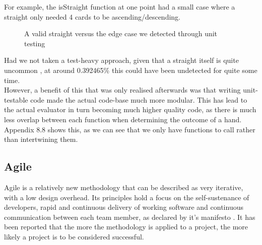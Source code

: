 \documentclass[11pt]{article}
\begin{document}
For example, the isStraight function at one point had a small case where a straight only needed 4 cards to be ascending/descending. \\

\begin{figure}[h]
	\caption{A valid straight versus the edge case we detected through unit testing}
\end{figure}

Had we not taken a test-heavy approach, given that a straight itself is quite uncommon \cite{str_uncommon}, at around 0.392465\% this could have been undetected for quite some time. \\

However, a benefit of this that was only realised afterwards was that writing unit-testable code made the actual code-base much more modular. This has lead to the actual evaluator in turn becoming much higher quality code, as there is much less overlap between each function when determining the outcome of a hand.  Appendix 8.8 shows this, as we can see that we only have functions to call rather than intertwining them. 


\newpage
\subsection{Agile}

Agile is a relatively new methodology that can be described as very iterative, with a low design overhead. Its principles hold a focus on the self-sustenance of developers, rapid and continuous delivery of working software and continuous communication between each team member, as declared by it's manifesto \cite{agile_principles}. It has been reported that the more the methodology is applied to a project, the more likely a project is to be considered successful. \cite{agile_success} \\ %
\end{document}
